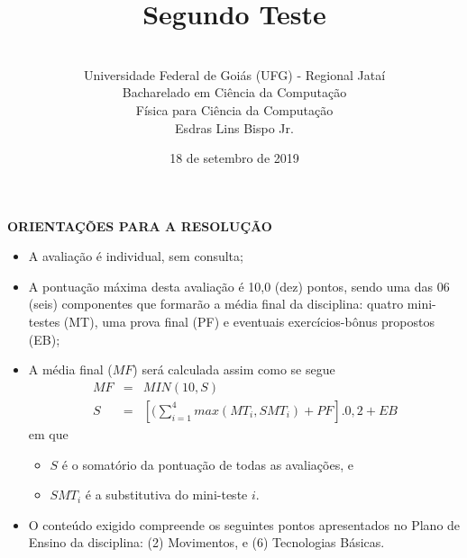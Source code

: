 \documentclass[12pt,a4paper,oneside]{article}
\author{\\Universidade Federal de Goiás (UFG) - Regional Jataí\\Bacharelado em Ciência da Computação \\Física para Ciência da Computação \\Esdras Lins Bispo Jr.}
\title{\sc \huge Segundo Teste}
\date{18 de setembro de 2019}
\begin{document}
\maketitle

{\bf ORIENTAÇÕES PARA A RESOLUÇÃO}

\footnotesize

\begin{itemize}
	\item A avaliação é individual, sem consulta;
	\item A pontuação máxima desta avaliação é 10,0 (dez) pontos, sendo uma das 06 (seis) componentes que formarão a média final da disciplina: quatro mini-testes (MT), uma prova final (PF) e eventuais exercícios-bônus propostos (EB);
	\item A média final ($MF$) será calculada assim como se segue
	\begin{eqnarray}
	MF & = & MIN(10, S) \nonumber \\
	S & = & [(\sum_{i=1}^{4} max(MT_i, SMT_i ) + PF].0,2  + EB \nonumber
	\end{eqnarray}
	em que 
	\begin{itemize}
		\item $S$ é o somatório da pontuação de todas as avaliações, e
		\item $SMT_i$ é a substitutiva do mini-teste $i$.
	\end{itemize}
	\item O conteúdo exigido compreende os seguintes pontos apresentados no Plano de Ensino da disciplina: (2) Movimentos, e (6) Tecnologias Básicas.
\end{itemize}


\begin{center}
\end{center}

\newpage

\normalsize
\end{document}
